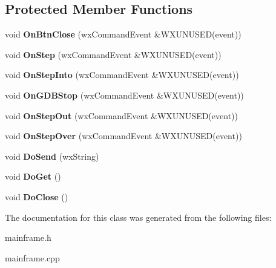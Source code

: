 \subsection*{Protected Member Functions}
\begin{DoxyCompactItemize}
\item 
\hypertarget{class_my_frame_a3cbbab43e62de3ad1a958d5dd7db6f2a}{void {\bfseries On\+Btn\+Close} (wx\+Command\+Event \&W\+X\+U\+N\+U\+S\+E\+D(event))}\label{class_my_frame_a3cbbab43e62de3ad1a958d5dd7db6f2a}

\item 
\hypertarget{class_my_frame_ab3a513c2d98a241958e984bc39767b7b}{void {\bfseries On\+Step} (wx\+Command\+Event \&W\+X\+U\+N\+U\+S\+E\+D(event))}\label{class_my_frame_ab3a513c2d98a241958e984bc39767b7b}

\item 
\hypertarget{class_my_frame_a785acc5e5d6079a1d4f47c141c84d233}{void {\bfseries On\+Step\+Into} (wx\+Command\+Event \&W\+X\+U\+N\+U\+S\+E\+D(event))}\label{class_my_frame_a785acc5e5d6079a1d4f47c141c84d233}

\item 
\hypertarget{class_my_frame_a6e34c7ff46ee88397c9f47da79122971}{void {\bfseries On\+G\+D\+B\+Stop} (wx\+Command\+Event \&W\+X\+U\+N\+U\+S\+E\+D(event))}\label{class_my_frame_a6e34c7ff46ee88397c9f47da79122971}

\item 
\hypertarget{class_my_frame_afe3f9e9c01c5a4f9994252bb299efc9d}{void {\bfseries On\+Step\+Out} (wx\+Command\+Event \&W\+X\+U\+N\+U\+S\+E\+D(event))}\label{class_my_frame_afe3f9e9c01c5a4f9994252bb299efc9d}

\item 
\hypertarget{class_my_frame_aa5dfa3ce3274546804d7f79c4bef79df}{void {\bfseries On\+Step\+Over} (wx\+Command\+Event \&W\+X\+U\+N\+U\+S\+E\+D(event))}\label{class_my_frame_aa5dfa3ce3274546804d7f79c4bef79df}

\item 
\hypertarget{class_my_frame_a886d4c26075715e7eaebd266b01876cc}{void {\bfseries Do\+Send} (wx\+String)}\label{class_my_frame_a886d4c26075715e7eaebd266b01876cc}

\item 
\hypertarget{class_my_frame_aa86ce79c4ed5fab633e230ce263c64a0}{void {\bfseries Do\+Get} ()}\label{class_my_frame_aa86ce79c4ed5fab633e230ce263c64a0}

\item 
\hypertarget{class_my_frame_a22a6ba88c1331d1eec76cb07312b93e6}{void {\bfseries Do\+Close} ()}\label{class_my_frame_a22a6ba88c1331d1eec76cb07312b93e6}

\end{DoxyCompactItemize}


The documentation for this class was generated from the following files\+:\begin{DoxyCompactItemize}
\item 
mainframe.\+h\item 
mainframe.\+cpp\end{DoxyCompactItemize}
